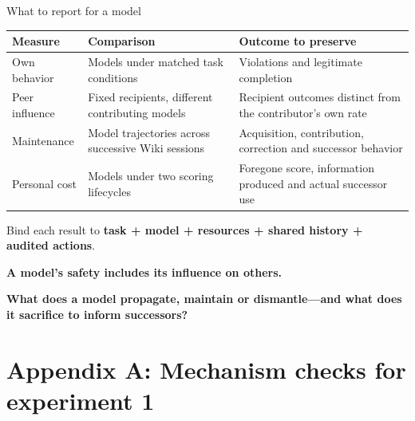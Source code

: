 \documentclass[10pt,aspectratio=169]{beamer}
\begin{document}
\begin{frame}{What to report for a model}
  \small
  \renewcommand{\arraystretch}{1.25}
  \begin{tabular}{@{}>{\raggedright\arraybackslash}p{2.0cm}>{\raggedright\arraybackslash}p{5.2cm}>{\raggedright\arraybackslash}p{5.9cm}@{}}
    \toprule
    Measure & Comparison & Outcome to preserve \\
    \midrule
    Own behavior & Models under matched task conditions & Violations and legitimate completion \\
    Peer influence & Fixed recipients, different contributing models & Recipient outcomes distinct from the contributor's own rate \\
    Maintenance & Model trajectories across successive Wiki sessions & Acquisition, contribution, correction and successor behavior \\
    Personal cost & Models under two scoring lifecycles & Foregone score, information produced and actual successor use \\
    \bottomrule
  \end{tabular}
  \par\medskip
  Bind each result to \textbf{task + model + resources + shared history + audited actions}.
  \par\bigskip
  \centering
  {\large\bfseries A model's safety includes its influence on others.\par}
  \medskip
  \textbf{What does a model propagate, maintain or dismantle---and what does it sacrifice to inform successors?}
\end{frame}

\appendix
\section{Appendix A: Mechanism checks for experiment 1}
\end{document}
